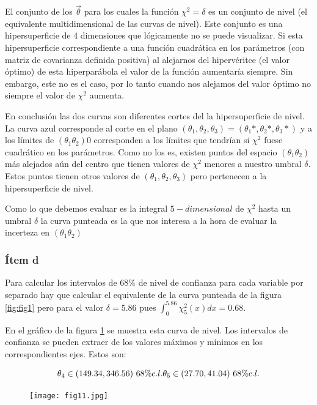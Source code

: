 El conjunto de los $\vec \theta$ para los cuales la función $\chi^2=\delta$ es un conjunto de nivel (el equivalente multidimensional de las curvas de nivel).
Este conjunto es una hipersuperficie de $4$ dimensiones que lógicamente no se puede visualizar.
Si esta hipersuperficie correspondiente a una función cuadrática en los parámetros (con matriz de covarianza definida positiva) al alejarnos del hipervéritce (el valor óptimo) de esta hiperparábola el valor de la función aumentaría siempre.
Sin embargo, este no es el caso, por lo tanto cuando nos alejamos del valor óptimo no siempre el valor de $\chi^2$ aumenta.

En conclusión las dos curvas son diferentes cortes del la hipersuperficie de nivel.
La curva azul corresponde al corte en el plano  $(\theta_1, \theta_2, \theta_3)=(\theta_1*, \theta_2*, \theta_3*)$ y a los límites de $(\theta_1 \theta_2)$0 corresponden a los límites que tendrían si $\chi^2$ fuese cuadrático en los parámetros.
Como no los es, existen puntos del espacio $(\theta_1 \theta_2)$ más alejados aún del centro que tienen valores de $\chi^2$ menores a nuestro umbral $\delta$.
Estos puntos tienen otros valores de $(\theta_1, \theta_2, \theta_3)$ pero pertenecen a la hipersuperficie de nivel.

Como lo que debemos evaluar es la integral $5-dimensional$ de $\chi^2$ hasta un umbral $\delta$ la curva punteada es la que nos interesa a la hora de evaluar la incerteza en $(\theta_1 \theta_2)$

\subsubsection*{Ítem d}
Para calcular los intervalos de $68\%$ de nivel de confianza para cada variable por separado hay que calcular el equivalente de la curva punteada de la figura \ref{fig:fig1} pero para el valor $\delta=5.86$ pues $\int_0^{5.86}\chi^2_5(x)dx=0.68$.

En el gráfico de la figura \ref{fig:fig11} se muestra esta curva de nivel.
Los intervalos de confianza se pueden extraer de los valores máximos y mínimos en los correspondientes ejes.
Estos son:

$$
\theta_4 \in (149.34, 346.56)\ 68\% c.l.
\theta_5 \in (27.70, 41.04) \ 68\% c.l. \\
$$

\begin{figure}
\centering
\texttt{[image: fig11.jpg]}
\caption[]{}
\label{fig:fig11}
\end{figure}


